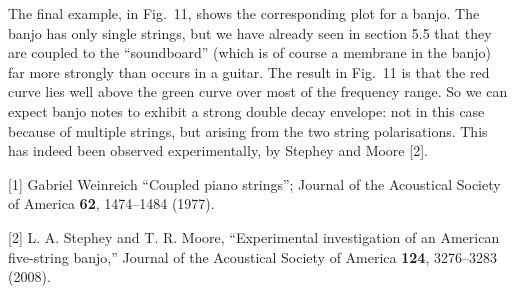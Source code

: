   The final example, in Fig.\ 11, shows the corresponding plot for a banjo. The 
  banjo has only single strings, but we have already seen in section 5.5 that 
  they are coupled to the ``soundboard'' (which is of course a membrane in the 
  banjo) far more strongly than occurs in a guitar. The result in Fig.\ 11 is 
  that the red curve lies well above the green curve over most of the frequency 
  range. So we can expect banjo notes to exhibit a strong double decay 
  envelope: not in this case because of multiple strings, but arising from the 
  two string polarisations. This has indeed been observed experimentally, by 
  Stephey and Moore [2]. 




  \sectionreferences{}[1] Gabriel Weinreich ``Coupled piano strings''; Journal 
  of the Acoustical Society of America \textbf{62}, 1474--1484 (1977). 

  [2] L. A. Stephey and T. R. Moore, “Experimental investigation of an American 
  five-string banjo,” Journal of the Acoustical Society of America 
  \textbf{124}, 3276--3283 (2008). 